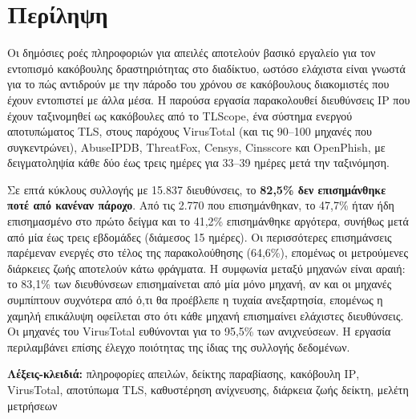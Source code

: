 \cleardoublepage

\chapter*{Περίληψη}

Οι δημόσιες ροές πληροφοριών για απειλές αποτελούν βασικό εργαλείο για τον εντοπισμό κακόβουλης
δραστηριότητας στο διαδίκτυο, ωστόσο ελάχιστα είναι γνωστά για το πώς αντιδρούν με την πάροδο του
χρόνου σε κακόβουλους διακομιστές που έχουν εντοπιστεί με άλλα μέσα. Η παρούσα εργασία
παρακολουθεί διευθύνσεις \foreignlanguage{english}{IP} που έχουν ταξινομηθεί ως κακόβουλες από το
\foreignlanguage{english}{TLScope}, ένα σύστημα ενεργού αποτυπώματος \foreignlanguage{english}{TLS},
στους παρόχους \foreignlanguage{english}{VirusTotal} (και τις 90--100 μηχανές που συγκεντρώνει),
\foreignlanguage{english}{AbuseIPDB}, \foreignlanguage{english}{ThreatFox},
\foreignlanguage{english}{Censys}, \foreignlanguage{english}{Cinsscore} και
\foreignlanguage{english}{OpenPhish}, με δειγματοληψία κάθε δύο έως τρεις ημέρες για 33--39 ημέρες
μετά την ταξινόμηση.

Σε επτά κύκλους συλλογής με 15.837 διευθύνσεις, το \textbf{82,5\% δεν επισημάνθηκε ποτέ από
κανέναν πάροχο}. Από τις 2.770 που επισημάνθηκαν, το 47,7\% ήταν ήδη επισημασμένο στο πρώτο δείγμα
και το 41,2\% επισημάνθηκε αργότερα, συνήθως μετά από μία έως τρεις εβδομάδες (διάμεσος 15 ημέρες).
Οι περισσότερες επισημάνσεις παρέμεναν ενεργές στο τέλος της παρακολούθησης (64,6\%), επομένως οι
μετρούμενες διάρκειες ζωής αποτελούν κάτω φράγματα. Η συμφωνία μεταξύ μηχανών είναι αραιή: το
83,1\% των διευθύνσεων επισημαίνεται από μία μόνο μηχανή, αν και οι μηχανές συμπίπτουν συχνότερα από
ό,τι θα προέβλεπε η τυχαία ανεξαρτησία, επομένως η χαμηλή επικάλυψη οφείλεται στο ότι κάθε μηχανή
επισημαίνει ελάχιστες διευθύνσεις. Οι μηχανές του \foreignlanguage{english}{VirusTotal} ευθύνονται
για το 95,5\% των ανιχνεύσεων. Η εργασία περιλαμβάνει επίσης έλεγχο ποιότητας της ίδιας της
συλλογής δεδομένων.

\bigskip\noindent
\textbf{Λέξεις-κλειδιά:} πληροφορίες απειλών, δείκτης παραβίασης, κακόβουλη
\foreignlanguage{english}{IP},
\foreignlanguage{english}{VirusTotal}, αποτύπωμα \foreignlanguage{english}{TLS}, καθυστέρηση
ανίχνευσης, διάρκεια ζωής δείκτη, μελέτη μετρήσεων

\cleardoublepage

